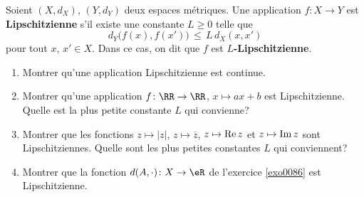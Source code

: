 
\begin{exercice}\label{exo0087}



Soient $(X,d_X)$, $(Y,d_Y)$ deux espaces métriques.  Une application $f \colon X \to Y$ est {\bf Lipschitzienne} s'il existe une constante $L \ge 0$ telle que 
\begin{equation}
	d_Y \bigl( f(x), f(x') \bigr) \,\le\, L \,d_X (x,x')
\end{equation}
pour tout  $x$, $x' \in X$. Dans ce cas, on dit que $f$ est {\bf $L$-Lipschitzienne}.


\begin{enumerate}
\item
Montrer qu'une application Lipschitzienne est continue.

\item
Montrer qu'une application $f \colon \RR \to \RR$, $x \mapsto ax+b$ est Lipschitzienne.  Quelle est la plus petite constante $L$ qui convienne?

\item
 Montrer que les fonctions $z \mapsto |z|$, $z \mapsto \overline z$, $z \mapsto {\rm Re\,} z$ et $z \mapsto {\rm Im\,} z$ sont Lipschitziennes.  Quelle sont les plus petites constantes $L$ qui conviennent?

\item 
Montrer que la fonction $d(A,\cdot)\colon X \to \eR$ de l'exercice \ref{exo0086} est Lipschitzienne.

\end{enumerate}

\end{exercice}
